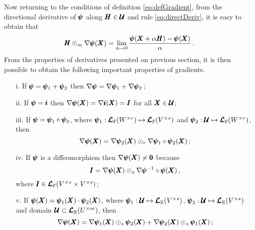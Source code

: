 Now returning to the conditions of definition \eqref{eq:defGradient}, from the directional derivative of $\pmb{\psi}$ along $\pmb{H}\in\pmb{\mathcal{U}}$ and rule \eqref{eq:directDeriv}, it is easy to obtain that
\begin{equation}
\pmb{H}\odot_m\nabla\pmb{\psi}(\pmb{X})=\lim_{\alpha\to 0} \dfrac{\pmb{\psi}(\pmb{X}+\alpha\pmb{H})-\pmb{\psi}(\pmb{X})}{\alpha}\,.
\end{equation}
From the properties of derivatives presented on previous section, it is then possible to obtain the following important properties of gradients.
\begin{itemize}
	\setlength\itemsep{.1em}
	\item[i.] If $\pmb{\psi}=\pmb{\psi}_1+\pmb{\psi}_2$ then $\nabla\pmb{\psi}=\nabla\pmb{\psi}_1+\nabla\pmb{\psi}_2\,$;
	\item[ii.] If $\pmb{\psi}=\pmb{i}$ then $\nabla\pmb{\psi}(\pmb{X})=\nabla\pmb{i}(\pmb{X})=\pmb{I}$ for all $\pmb{X}\in\pmb{\mathcal{U}}$;
	\item[iii.] If $\pmb{\psi}=\pmb{\psi}_1\circ\pmb{\psi}_2$, where $\pmb{\psi}_1 : \pmb{\mathcal{L}}_{\mathbb{F}}(W^{\times r}) \mapsto \pmb{\mathcal{L}}_{\mathbb{F}}(V^{\times s})$ and $\pmb{\psi}_2 : \pmb{\mathcal{U}} \mapsto \pmb{\mathcal{L}}_{\mathbb{F}}(W^{\times r})$, then
	\begin{equation}\label{eq:prop1Grad}
	\nabla\pmb{\psi}(\pmb{X}) = \nabla\pmb{\psi}_2(\pmb{X}) \odot_r \nabla\pmb{\psi}_1\circ\pmb{\psi}_2(\pmb{X})\,;
	\end{equation}	
	\item[iv.] If $\pmb{\psi}$ is a diffeomorphism then $\nabla\pmb{\psi}(\pmb{X})\neq\pmb{0}$ because
	\begin{equation}\label{eq:indentDiffeo}
	\pmb{I} = \nabla\pmb{\psi}(\pmb{X}) \odot_s \nabla\pmb{\psi}^{-1}\circ\pmb{\psi}(\pmb{X})\,,
	\end{equation}
	where $\pmb{I}\in\pmb{\mathcal{L}}_{\mathbb{F}}(V^{\times s}\times V^{\times s})$;	
	\item[v.] If $\pmb{\psi}(\pmb{X})=\pmb{\psi}_1(\pmb{X})\cdot\pmb{\psi}_2(\pmb{X})$, where   $\pmb{\psi}_1 : \pmb{\mathcal{U}} \mapsto \pmb{\mathcal{L}}_{\mathbb{R}}(V^{\times s})$, $\pmb{\psi}_2 : \pmb{\mathcal{U}} \mapsto \pmb{\mathcal{L}}_{\mathbb{R}}(V^{\times s})$ and domain $\pmb{\mathcal{U}}\subset\pmb{\mathcal{L}}_{\mathbb{R}}(U^{\times m})$, then
	\begin{equation}\label{eq:prop2Grad}
	\fua{\nabla\tnr{\psi}}{\tnr{X}} = \fua{\nabla\tnr{\psi}_1}{\tnr{X}}\odot_s\fua{\tnr{\psi}_2}{\tnr{X}}+\fua{\nabla\tnr{\psi}_2}{\tnr{X}}\odot_s\fua{\tnr{\psi}_1}{\tnr{X}}\,;

\end{equation}
\end{itemize}
